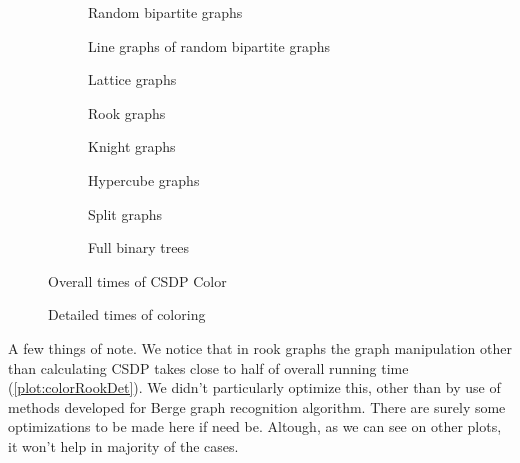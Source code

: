 \begin{figure}
  \begin{subfigure}{.5\textwidth}
    \centering
    
    \caption{Random bipartite graphs}
  \end{subfigure}%
  \begin{subfigure}{.5\textwidth}
    \centering
    
    \caption{Line graphs of random bipartite graphs}
  \end{subfigure}
  \begin{subfigure}{.5\textwidth}
    \centering
    
    \caption{Lattice graphs}
  \end{subfigure}%
  \begin{subfigure}{.5\textwidth}
    \centering
    
    \caption{Rook graphs}
  \end{subfigure}
  \begin{subfigure}{.5\textwidth}
    \centering
    
    \caption{Knight graphs}
  \end{subfigure}%
  \begin{subfigure}{.5\textwidth}
    \centering%
    
    \caption{Hypercube graphs}
  \end{subfigure}
  \begin{subfigure}{.5\textwidth}
    \centering
    
    \caption{Split graphs}
  \end{subfigure}%
  \begin{subfigure}{.5\textwidth}
    \centering
    
    \caption{Full binary trees}
  \end{subfigure}
  \caption{Overall times of CSDP Color}
\end{figure}

\begin{figure}
  \centering
  
  \caption{Detailed times of coloring}
\end{figure}

A few things of note. We notice that in rook graphs the graph manipulation other than calculating CSDP takes close to half of overall running time (\cref{plot:colorRookDet}). We didn't particularly optimize this, other than by use of methods developed for Berge graph recognition algorithm. There are surely some optimizations to be made here if need be. Altough, as we can see on other plots, it won't help in majority of the cases.